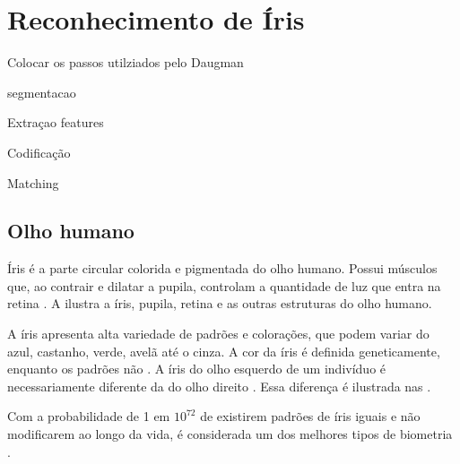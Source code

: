 \section{Reconhecimento de Íris}

\par Colocar os passos utilziados pelo Daugman \cite{daugman2004}

\par segmentacao

\par Extraçao features

\par Codificação

\par Matching

\subsection{Olho humano}\label{sec:iris:olho}

\par Íris é a parte circular colorida e pigmentada do olho humano. Possui músculos que, ao contrair e dilatar a pupila, controlam a quantidade de luz que entra na retina \cite{adlerIris2003}. A  ilustra a íris, pupila, retina e as outras estruturas do olho humano.

%

\par A íris apresenta alta variedade de padrões e colorações, que podem variar do azul, castanho, verde, avelã até o cinza. A cor da íris é definida geneticamente, enquanto os padrões não \cite{adlerIris2003}. A íris do olho esquerdo de um indivíduo é necessariamente diferente da do olho direito \cite{wayman2005biometric}. Essa diferença é ilustrada nas .

\par Com a probabilidade de 1 em $10^{72}$ de existirem padrões de íris iguais e não modificarem ao longo da vida, é considerada um dos melhores tipos de biometria \cite{iris_UFRJ}.


